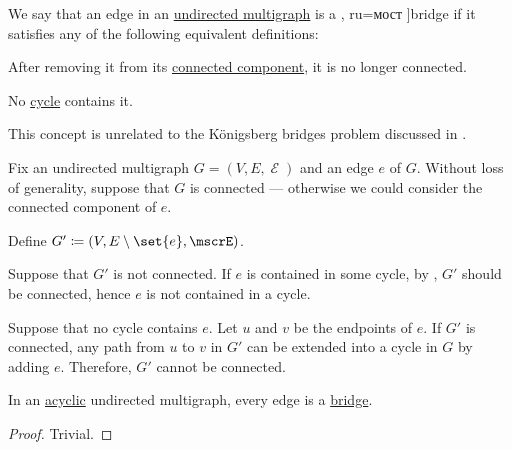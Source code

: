 \begin{definition}\label{def:graph_bridge}
  We say that an edge in an \hyperref[def:hypergraph/multigraph]{undirected multigraph} is a \term[bg=мост (\cite[134]{Мирчев2001Графи}, ru=мост \cite[\S 8.1.2]{Новиков2013ДискретнаяМатематика}]{bridge} if it satisfies any of the following equivalent definitions:
  \begin{thmenum}
     After removing it from its \hyperref[def:graph_connected_component]{connected component}, it is no longer connected.

     No \hyperref[def:graph_cycle]{cycle} contains it.
  \end{thmenum}
\end{definition}
\begin{comments}
  \item This concept is unrelated to the K\"onigsberg bridges problem discussed in .
\end{comments}
\begin{defproof}
  Fix an undirected multigraph \( G = (V, E, \mscrE) \) and an edge \( e \) of \( G \). Without loss of generality, suppose that \( G \) is connected --- otherwise we could consider the connected component of \( e \).

  Define \( G' \coloneqq (V, E \setminus \set{ e }, \mscrE) \).

   Suppose that \( G' \) is not connected. If \( e \) is contained in some cycle, by , \( G' \) should be connected, hence \( e \) is not contained in a cycle.

   Suppose that no cycle contains \( e \). Let \( u \) and \( v \) be the endpoints of \( e \). If \( G' \) is connected, any path from \( u \) to \( v \) in \( G' \) can be extended into a cycle in \( G \) by adding \( e \). Therefore, \( G' \) cannot be connected.
\end{defproof}

\begin{proposition}\label{thm:acyclic_bridges}
  In an \hyperref[def:acyclic_graph]{acyclic} undirected multigraph, every edge is a \hyperref[def:graph_bridge]{bridge}.
\end{proposition}
\begin{proof}
  Trivial.
\end{proof}

